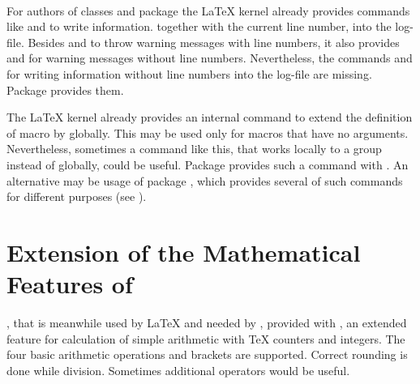 \begin{Declaration}
  \\
\end{Declaration}%
%
%
For authors of classes and package the \LaTeX{} kernel already provides
commands like  and  to write information.
together with the current line number, into the log-file. Besides
 and  to throw warning messages with
line numbers, it also provides  and
 for warning messages without line
numbers. Nevertheless, the commands  and
 for writing information without line numbers into the
log-file are missing. Package  provides them.
%
%


\begin{Declaration}
\end{Declaration}%
%
The \LaTeX{} kernel already provides an internal command 
to extend the definition of macro  by 
globally. This may be used only for macros that have no
arguments. Nevertheless, sometimes a command like this, that works locally to
a group instead of globally, could be useful. Package 
provides such a command with . An alternative may be
usage of package , which provides
several of such commands for different purposes (see \cite{package:etoolbox}).
%


\section{Extension of the Mathematical Features of \eTeX}
\label{sec:scrbase:etex}

\eTeX{}, that is meanwhile used by \LaTeX{} and needed by \KOMAScript{},
provided with , an extended feature for
calculation of simple arithmetic with \TeX{} counters and
integers. The four basic arithmetic operations and brackets are
supported. Correct rounding is done while division. Sometimes additional
operators would be useful.

